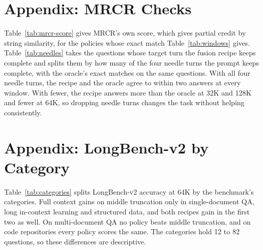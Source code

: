 \documentclass[letterpaper]{article} %
\newcommand{\recipe}{fusion recipe}
\begin{document}
\section{Appendix: MRCR Checks}
Table~\ref{tab:mrcr-score} gives MRCR's own score, which gives partial credit by string similarity, for the policies whose exact match Table~\ref{tab:windows} gives. Table~\ref{tab:needles} takes the questions whose target turn the \recipe{} keeps complete and splits them by how many of the four needle turns the prompt keeps complete, with the oracle's exact matches on the same questions. With all four needle turns, the recipe and the oracle agree to within two answers at every window. With fewer, the recipe answers more than the oracle at 32K and 128K and fewer at 64K, so dropping needle turns changes the task without helping consistently.

\begin{table}[t]
\centering
\small

\caption{MRCR's own score, in percent: the string similarity between the target and the answer's text after the random string, or zero if the answer lacks the string. Table~\ref{tab:windows} gives exact match for the same runs.}
\label{tab:mrcr-score}
\end{table}

\begin{table}[t]
\centering
\small

\caption{MRCR questions whose target turn the \recipe{} keeps complete, by how many of the four needle turns the prompt keeps complete: the number of questions, the recipe's exact matches and the oracle's on the same questions. At 262K, 119 of the 120 prompts keep all four.}
\label{tab:needles}
\end{table}

\section{Appendix: LongBench-v2 by Category}
Table~\ref{tab:categories} splits LongBench-v2 accuracy at 64K by the benchmark's categories. Full context gains on middle truncation only in single-document QA, long in-context learning and structured data, and both recipes gain in the first two as well. On multi-document QA no policy beats middle truncation, and on code repositories every policy scores the same. The categories hold 12 to 82 questions, so these differences are descriptive.

\begin{table}[t]
\centering
\small

\caption{LongBench-v2 accuracy by category at the 64K window, in percent; full context is the 262K run.}
\label{tab:categories}
\end{table}

% 
\end{document}
